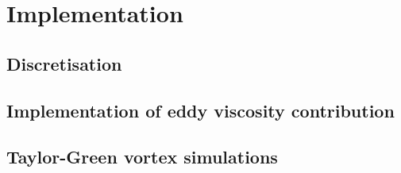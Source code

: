\newpage

\section{Implementation}
\subsection{Discretisation}
\subsection{Implementation of eddy viscosity contribution}
\subsection{Taylor-Green vortex simulations}
